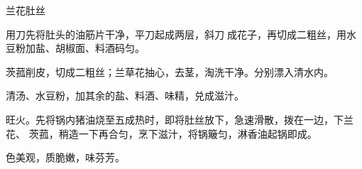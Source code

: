%
%
%
%
%
%
%
\begin{recipe}{兰花肚丝}

\ingredients


\preparation

\step 用刀先将肚头的油筋片干净，平刀起成两层，斜刀𠟤成花子，再切成二粗丝，用水
豆粉加盐、胡椒面、料酒码匀。

\step 茨菰削皮，切成二粗丝；兰草花抽心，去茎，淘洗干净。分别漂入清水内。

\step 清汤、水豆粉，加其余的盐、料酒、味精，兑成滋汁。

\step 旺火。先将锅内猪油烧至五成热时，即将肚丝放下，急速滑散，拨在一边，下兰花、
茨菰，稍造一下再合匀，烹下滋汁，将锅簸匀，淋香油起锅即成。

\features

色美观，质脆嫩，味芬芳。

\end{recipe}


